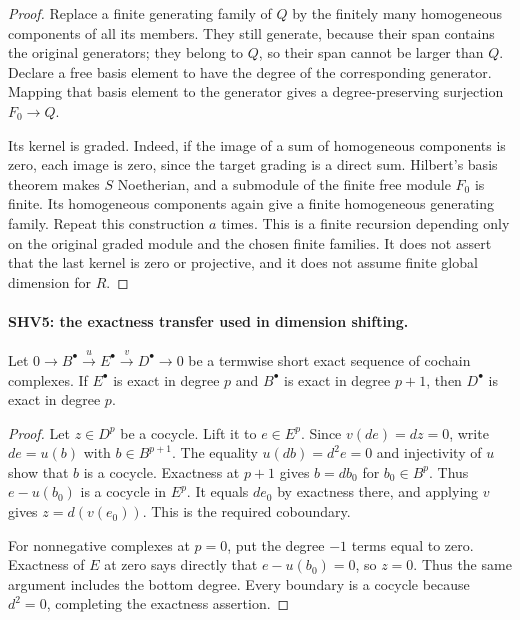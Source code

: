 \documentclass[11pt,a4paper]{article}
\numberwithin{equation}{section}
\theoremstyle{remark}\newtheorem{remark}[theorem]{Remark}
\begin{document}
\begin{proof}
Replace a finite generating family of $Q$ by the finitely many
homogeneous components of all its members.  They still generate,
because their span contains the original generators; they belong to
$Q$, so their span cannot be larger than $Q$.  Declare a free basis
element to have the degree of the corresponding generator.  Mapping
that basis element to the generator gives a degree-preserving
surjection $F_0\to Q$.

Its kernel is graded.  Indeed, if the image of a sum of homogeneous
components is zero, each image is zero, since the target grading
is a direct sum.  Hilbert's basis theorem makes $S$ Noetherian,
and a submodule of the finite free module $F_0$ is finite.
Its homogeneous components again give a finite homogeneous
generating family.  Repeat this construction $a$ times.
This is a finite recursion depending only on the original graded
module and the chosen finite families.  It does not assert that the
last kernel is zero or projective, and it does not assume finite
global dimension for $R$.
\end{proof}

\paragraph{SHV5: the exactness transfer used in dimension shifting.}
\label{claim:SHV5}
Let $0\to B^\bullet\xrightarrow{u}E^\bullet
\xrightarrow{v}D^\bullet\to0$ be a termwise short exact sequence
of cochain complexes.  If $E^\bullet$ is exact in degree $p$
and $B^\bullet$ is exact in degree $p+1$, then $D^\bullet$
is exact in degree $p$.

\begin{proof}
Let $z\in D^p$ be a cocycle.  Lift it to $e\in E^p$.
Since $v(de)=d z=0$, write $de=u(b)$ with $b\in B^{p+1}$.
The equality $u(db)=d^2e=0$ and injectivity of $u$ show that
$b$ is a cocycle.  Exactness at $p+1$ gives $b=db_0$ for
$b_0\in B^p$.  Thus $e-u(b_0)$ is a cocycle in $E^p$.
It equals $de_0$ by exactness there, and applying $v$ gives
$z=d(v(e_0))$.  This is the required coboundary.

For nonnegative complexes at $p=0$, put the degree $-1$ terms
equal to zero.  Exactness of $E$ at zero says directly that
$e-u(b_0)=0$, so $z=0$.  Thus the same argument includes the
bottom degree.  Every boundary is a cocycle because $d^2=0$,
completing the exactness assertion.
\end{proof}
\end{document}
